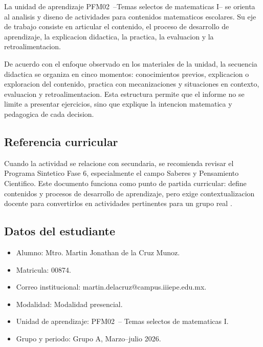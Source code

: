 \documentclass[
	spanish,
	letterpaper, oneside
]{article}
\makeatletter
\def\coursename {Temas selectos de matematicas I}
\def\coursecode {PFM02}
\def\studentfullname {Mtro. Martin Jonathan de la Cruz Munoz}
\def\studentid {00874}
\def\studentemail {martin.delacruz@campus.iiiepe.edu.mx}
\def\programmodality {Modalidad presencial}
\def\coursegroup {Grupo A}
\def\courseperiod {Marzo--julio 2026}
\def\curriculumsource {Programa Sintetico Fase 6}
\def\formativefield {Saberes y Pensamiento Cientifico}
\makeatother
\begin{document}
La unidad de aprendizaje \coursecode\ --\coursename-- se orienta al analisis y
diseno de actividades para contenidos matematicos escolares. Su eje de trabajo
consiste en articular el contenido, el proceso de desarrollo de aprendizaje, la
explicacion didactica, la practica, la evaluacion y la retroalimentacion.

De acuerdo con el enfoque observado en los materiales de la unidad, la
secuencia didactica se organiza en cinco momentos: conocimientos previos,
explicacion o exploracion del contenido, practica con mecanizaciones y
situaciones en contexto, evaluacion y retroalimentacion. Esta estructura permite
que el informe no se limite a presentar ejercicios, sino que explique la
intencion matematica y pedagogica de cada decision.

\subsection{Referencia curricular}

Cuando la actividad se relacione con secundaria, se recomienda revisar el
\curriculumsource, especialmente el campo \formativefield. Este documento
funciona como punto de partida curricular: define contenidos y procesos de
desarrollo de aprendizaje, pero exige contextualizacion docente para convertirlos
en actividades pertinentes para un grupo real \citep{sepFase6}.


\subsection{Datos del estudiante}

\begin{itemize}
	\item Alumno: \studentfullname.
	\item Matricula: \studentid.
	\item Correo institucional: \studentemail.
	\item Modalidad: \programmodality.
	\item Unidad de aprendizaje: \coursecode\ -- \coursename.
	\item Grupo y periodo: \coursegroup, \courseperiod.
\end{itemize}
\end{document}
